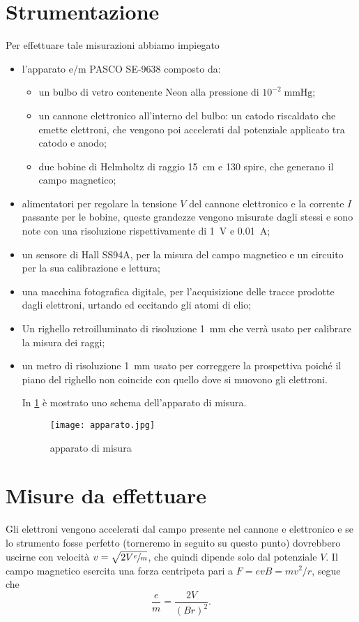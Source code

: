 \section{Strumentazione}
	Per effettuare tale misurazioni abbiamo impiegato

	\begin{itemize}
		\item l'apparato e/m PASCO SE-9638 composto da:
		\begin{itemize}
			\item un bulbo di vetro contenente Neon alla pressione di $10^{-2} \; \si{\mmHg}$;
			\item un cannone elettronico all'interno del bulbo: un catodo riscaldato che emette elettroni, che vengono poi accelerati dal potenziale applicato tra catodo e anodo;
			\item due bobine di Helmholtz di raggio \SI{15}{cm} e 130 spire, che generano il campo magnetico;
		\end{itemize}
		\item alimentatori per regolare la tensione $V$ del cannone elettronico e la corrente $I$ passante per le bobine, queste grandezze vengono misurate dagli stessi e sono note con una risoluzione rispettivamente di \SI{1}{V} e $ $\SI{0.01}{\ampere};
		\item un sensore di Hall SS94A, per la misura del campo magnetico e un circuito per la sua calibrazione e lettura;
		\item una macchina fotografica digitale, per l'acquisizione delle tracce prodotte dagli elettroni, urtando ed eccitando gli atomi di elio;
		\item Un righello retroilluminato di risoluzione \SI{1}{\mm} che verrà usato per calibrare la misura dei raggi;
		\item un metro di risoluzione \SI{1}{\mm} usato per correggere la prospettiva poiché il piano del righello non coincide con quello dove si muovono gli elettroni.

In \figurename{ \ref{apparato}} è mostrato uno schema dell'apparato di misura.

	\begin{figure}[H]
		\centering
		\texttt{[image: apparato.jpg]}
		\caption{apparato di misura}
		\label{apparato}
	\end{figure}
	
	\end{itemize}
	
\section{Misure da effettuare}
Gli elettroni vengono accelerati dal campo presente nel cannone e elettronico e se lo strumento fosse perfetto (torneremo in seguito su questo punto) dovrebbero uscirne con velocità $v = \sqrt{2V \sfrac{e}{m} }$, che quindi dipende solo dal potenziale $V$.
Il campo magnetico esercita una forza centripeta pari a $F = evB = mv^2/r$, segue che $$\frac{e}{m}=\frac{2V}{(B r)^2}.$$

